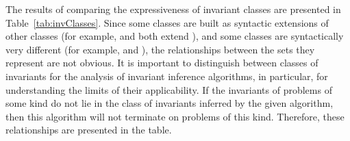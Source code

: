 \invariantreprclasses{\label{fig:Representations-new}}

The results of comparing the expressiveness of invariant classes are presented in Table~\cref{tab:invClasses}.
Since some classes are built as syntactic extensions of other classes (for example, \syncRegFlatClass{} and \syncRegFullClass{} both extend \regclass{}), and some classes are syntactically very different (for example, \regclass{} and \elemclass{}), the relationships between the sets they represent are not obvious.
It is important to distinguish between classes of invariants for the analysis of invariant inference algorithms, in particular, for understanding the limits of their applicability. If the invariants of problems of some kind do not lie in the class of invariants inferred by the given algorithm, then this algorithm will not terminate on problems of this kind. Therefore, these relationships are presented in the table.

